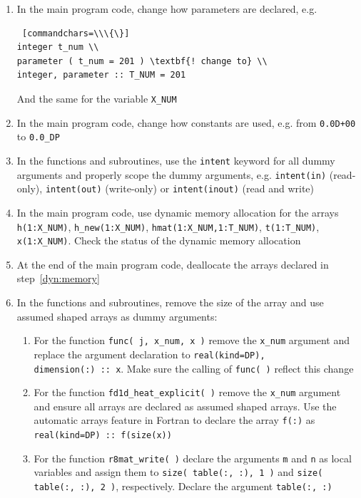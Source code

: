 \documentclass[12pt]{article}
\begin{document}
\begin{enumerate}
\begin{Verbatim} [commandchars=\\\{\}]
  fd1d_heat_explicit.f90 -o \textit{fd1d_heat_explicit.f90_pol}
mv \textit{fd1d_heat_explicit.f90_pol} fd1d_heat_explicit.f90
\end{Verbatim}
\item In the main program code, change how parameters are declared, e.g.
\begin{Verbatim} [commandchars=\\\{\}]
integer t_num \\
parameter ( t_num = 201 ) \textbf{! change to} \\
integer, parameter :: T_NUM = 201
\end{Verbatim}
And the same for the variable \texttt{X\_NUM}
\item In the main program code, change how constants are used, e.g. from \texttt{0.0D+00} to 
\texttt{0.0\_DP}
\item In the functions and subroutines, use the \texttt{intent} keyword for all dummy arguments and properly
  scope the dummy arguments, e.g. \texttt{intent(in)} (read-only), \texttt{intent(out)} (write-only) or
  \texttt{intent(inout)} (read and write)
\item In the main program code, use dynamic memory allocation for the arrays \texttt{h(1:X\_NUM)}, 
\texttt{h\_new(1:X\_NUM)}, \texttt{hmat(1:X\_NUM,1:T\_NUM)}, \texttt{t(1:T\_NUM)}, \texttt{x(1:X\_NUM)}. Check
the status of the dynamic memory allocation\label{dyn:memory}
\item At the end of the main program code, deallocate the arrays declared in step~\ref{dyn:memory}
\item In the functions and subroutines, remove the size of the array and use assumed shaped
arrays as dummy arguments:
\begin{enumerate}
\item For the function \texttt{func( j, x\_num, x )} remove the \texttt{x\_num} argument and
replace the argument declaration to \texttt{real(kind=DP), dimension(:)\ ::\ x}. Make sure
the calling of \texttt{func( )} reflect this change
\item For the function \texttt{fd1d\_heat\_explicit( )} remove the \texttt{x\_num} argument
and ensure all arrays are declared as assumed shaped arrays. Use the automatic arrays feature in Fortran
to declare the array \texttt{f(:)} as \texttt{real(kind=DP) ::\ f(size(x))}
\item For the function \texttt{r8mat\_write( )} declare the arguments \texttt{m} and \texttt{n} as local variables
  and assign them
to \texttt{size( table(:, :), 1 )} and \texttt{size( table(:, :), 2 )}, respectively. Declare the argument \texttt{table(:, :)}

\end{enumerate}
\end{enumerate}
\end{document}
